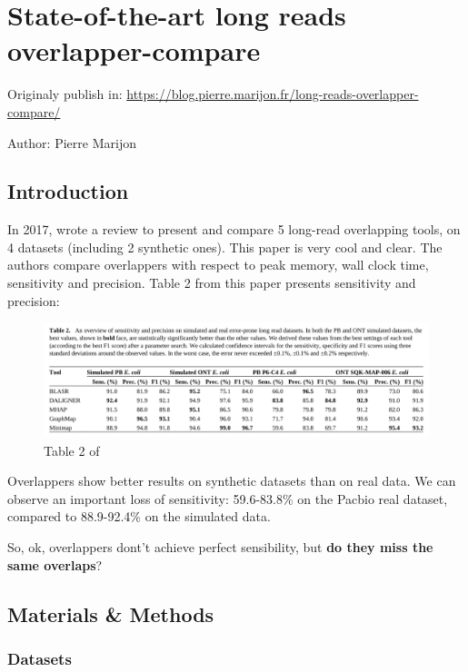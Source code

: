 \documentclass[./main.tex]{subfiles}
\begin{document}
\section{State-of-the-art long reads overlapper-compare}

Originaly publish in: \url{https://blog.pierre.marijon.fr/long-reads-overlapper-compare/}

Author: Pierre Marijon

\subsection{Introduction}\label{preassembly:ovl:introduction}

In 2017, \citeauthor{ovl_bench} wrote a review \cite{ovl_bench}
to present and compare 5 long-read overlapping tools, on 4 datasets
(including 2 synthetic ones). This paper is very cool and clear. The
authors compare overlappers with respect to peak memory, wall clock
time, sensitivity and precision. Table 2 from this paper presents
sensitivity and precision:

\begin{figure}[ht]
\centering
\includegraphics[width=\textwidth]{paper/blog_post/table_res_review.png}
\caption{Table 2 of \cite{ovl_bench}}
\end{figure}

Overlappers show better results on synthetic datasets than on real data.
We can observe an important loss of sensitivity: 59.6-83.8\% on the
Pacbio real dataset, compared to 88.9-92.4\% on the simulated data.

So, ok, overlappers dont't achieve perfect sensibility, but \textbf{do
they miss the same overlaps}?

\subsection{Materials \& Methods}\label{preassembly:ovl:materials-methods}

\subsubsection{Datasets}\label{preassembly:ovl:datasets}
\end{document}

